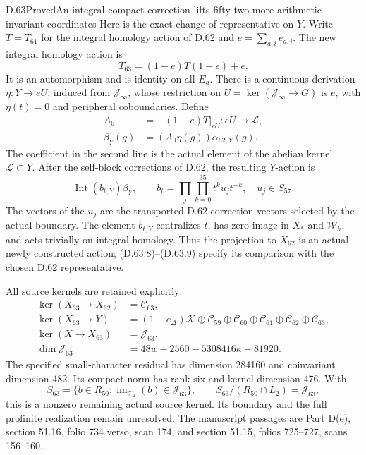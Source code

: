 \begin{statement}{D.63}{Proved}{An integral compact correction lifts fifty-two more arithmetic invariant coordinates}
Here is the exact change of representative on \(Y\).
Write \(T=T_{61}\) for the integral homology action
of D.62 and \(e=\sum_{a,i}\widetilde e_{a,i}\).
The new integral homology action is
\[
                    T_{63}=(1-e)T(1-e)+e.
 \tag{D.63.7}
\]
It is an automorphism and is identity on all
\(\widetilde E_a\). There is a continuous derivation
\(\eta:Y\to eU\), induced from \(\mathcal J_\infty\),
whose restriction on \(U=\ker(\mathcal J_\infty\to G)\)
is \(e\), with \(\eta(t)=0\) and peripheral coboundaries.
Define
\[
 \begin{aligned}
 A_0&=-(1-e)T|_{eU}:eU\longrightarrow\mathcal L,\\
 \beta_Y(g)&=(A_0\eta(g))\alpha_{62,Y}(g).
 \end{aligned}
 \tag{D.63.8}
\]
The coefficient in the second line is the actual
element of the abelian kernel \(\mathcal L\subset Y\).
After the self-block corrections of D.62, the resulting
\(Y\)-action is
\[
                  \operatorname{Int}(b_{t,Y})\beta_Y,
 \qquad
 b_t=\prod_j\prod_{k=0}^{35}t^ku_jt^{-k},\quad u_j\in S_{57}.
 \tag{D.63.9}
\]
The vectors of the \(u_j\) are the transported D.62
correction vectors selected by the actual boundary.
The element \(b_{t,Y}\) centralizes \(t\), has zero
image in \(X_*\) and \(\mathcal W_h\), and acts
trivially on integral homology. Thus the projection
to \(X_{62}\) is an actual newly constructed action;
(D.63.8)--(D.63.9) specify its comparison with the
chosen D.62 representative.

All source kernels are retained explicitly:
\[
 \begin{aligned}
 \ker(X_{63}\to X_{62})&=\mathcal C_{63},\\
 \ker(X_{63}\to Y)&=(1-e_\Delta)\mathcal K
       \oplus\mathcal C_{59}\oplus\mathcal C_{60}
       \oplus\mathcal C_{61}\oplus\mathcal C_{62}\oplus\mathcal C_{63},\\
 \ker(X\to X_{63})&=\mathcal J_{63},\\
 \dim\mathcal J_{63}&=48w-2560-5308416\kappa-81920.
 \end{aligned}
 \tag{D.63.10}
\]
The specified small-character residual has dimension
284160 and coinvariant dimension 482. Its compact
norm has rank six and kernel dimension 476. With
\[
 S_{63}=\{b\in R_{50}:
       \operatorname{im}_{\mathcal T_2}(b)\in\mathcal J_{63}\},
 \qquad S_{63}/(R_{50}\cap L_2)=\mathcal J_{63},
 \tag{D.63.11}
\]
this is a nonzero remaining actual source kernel.
Its boundary and the full profinite realization
remain unresolved. The manuscript passages are
Part D(e), section 51.16, folio 734 verso, scan 174,
and section 51.15, folios 725--727, scans 156--160.
\end{statement}
